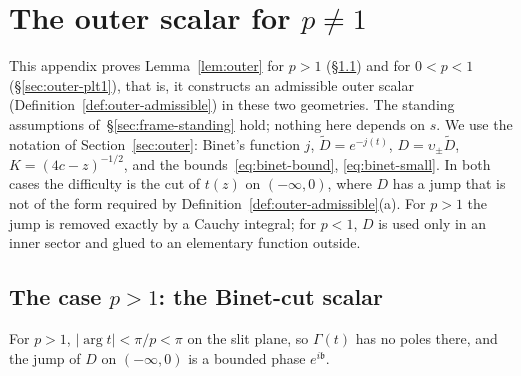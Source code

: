 
\section{\texorpdfstring{The outer scalar for $p\ne1$}{The outer scalar for p different from 1}}\label{app:outer}

This appendix proves Lemma~\ref{lem:outer} for $p>1$ (\S\ref{sec:outer-pgt1}) and for $0<p<1$
(\S\ref{sec:outer-plt1}), that is, it constructs an admissible outer scalar (Definition~\ref{def:outer-admissible}) in
these two geometries. The standing assumptions of~\S\ref{sec:frame-standing} hold; nothing here depends on $s$. We use
the notation of Section~\ref{sec:outer}: Binet's function $j$, $\tilde D=e^{-j(t)}$, $D=\upsilon_\pm\tilde D$,
$K=(4c-z)^{-1/2}$, and the bounds~\eqref{eq:binet-bound}, \eqref{eq:binet-small}. In both cases the difficulty is the
cut of $t(z)$ on $(-\infty,0)$, where $D$ has a jump that is not of the form required by
Definition~\ref{def:outer-admissible}(a). For $p>1$ the jump is removed exactly by a Cauchy integral; for $p<1$, $D$ is
used only in an inner sector and glued to an elementary function outside.

\subsection{\texorpdfstring{The case $p>1$: the Binet-cut scalar}{The case p>1: the Binet-cut scalar}}\label{sec:outer-pgt1}
For $p>1$, $|\arg t|<\pi/p<\pi$ on the slit plane, so $\Gamma(t)$ has no poles there, and the jump of $D$ on
$(-\infty,0)$ is a bounded phase $e^{i\mathfrak b}$.


